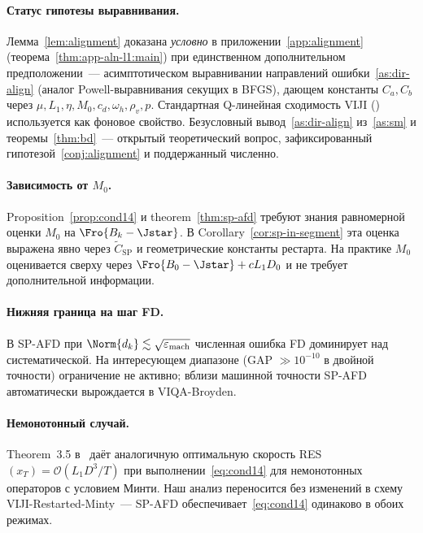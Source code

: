 \paragraph{Статус гипотезы выравнивания.}
Лемма~\ref{lem:alignment} доказана \emph{условно} в
приложении~\ref{app:alignment} (теорема~\ref{thm:app-aln-l1:main})
при единственном дополнительном предположении~--- асимптотическом
выравнивании направлений ошибки~\ref{as:dir-align}
(аналог Powell-выравнивания секущих в BFGS), дающем константы
$C_a, C_b$ через $\mu, L_1, \eta, M_0, c_d, \omega_h, \rho_v, p$.
Стандартная Q-линейная сходимость VIJI \textup{(}\cite[Theorem~3.4]{Agafonov2024VIJI}\textup{)}
используется как фоновое свойство. Безусловный вывод~\ref{as:dir-align}
из~\ref{as:sm} и теоремы~\ref{thm:bd}~--- открытый теоретический вопрос,
зафиксированный гипотезой~\ref{conj:alignment} и поддержанный численно.

\paragraph{Зависимость от $M_0$.}
Proposition~\ref{prop:cond14} и theorem~\ref{thm:sp-afd} требуют знания
равномерной оценки $M_0$ на $\Fro{B_k - \Jstar}$. В Corollary~\ref{cor:sp-in-segment}
эта оценка выражена явно через $\widetilde C_{\mathrm{SP}}$ и геометрические константы
рестарта. На практике $M_0$ оценивается сверху через $\Fro{B_0 - \Jstar} + c L_1 D_0$
и не требует дополнительной информации.

\paragraph{Нижняя граница на шаг FD.}
В SP-AFD при $\Norm{d_k} \lesssim \sqrt{\varepsilon_{\mathrm{mach}}}$ численная
ошибка FD доминирует над систематической. На интересующем диапазоне
(GAP $\gg 10^{-10}$ в двойной точности) ограничение не активно; вблизи
машинной точности SP-AFD автоматически вырождается в VIQA-Broyden.

\paragraph{Немонотонный случай.}
Theorem~3.5 в~\cite{Agafonov2024VIJI} даёт аналогичную оптимальную скорость
RES$(x_T) = \mathcal O(L_1 D^3 / T)$ при выполнении~\eqref{eq:cond14} для
немонотонных операторов с условием Минти. Наш анализ переносится без
изменений в схему VIJI-Restarted-Minty~--- SP-AFD обеспечивает~\eqref{eq:cond14}
одинаково в обоих режимах.

